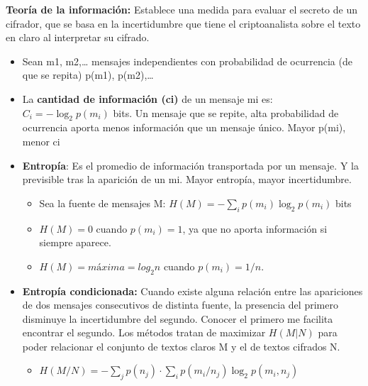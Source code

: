 \documentclass[12pt, twoside, openright]{report} %
\begin{document}
\textbf{Teoría de la información:} Establece una medida para evaluar el secreto de un cifrador, que se basa en la incertidumbre que tiene el criptoanalista sobre el texto en claro al interpretar su cifrado.

\begin{itemize}
	\item Sean m1, m2,\ldots{} mensajes independientes con probabilidad de ocurrencia (de que se repita) p(m1), p(m2),\ldots{}
	\item La \textbf{cantidad de información (ci)} de un mensaje mi es: $C_i=-\log_2 p(m_i)$ bits. Un mensaje que se repite, alta probabilidad de ocurrencia aporta menos información que un mensaje único. Mayor p(mi), menor ci
	\item \textbf{Entropía}: Es el promedio de información transportada por un mensaje. Y la previsible tras la aparición de un mi. Mayor entropía, mayor incertidumbre.
	      \begin{itemize}
		      \item Sea la fuente de mensajes M: $H(M)=-\sum\limits_i p(m_i) \log_2 p(m_i)$ bits
		      \item $H(M)=0$ cuando $p(m_i)=1$, ya que no aporta información si siempre aparece.
		      \item $H(M)=máxima=log_2 n$ cuando $p(m_i)=1/n$.
	      \end{itemize}
	\item \textbf{Entropía condicionada:} Cuando existe alguna relación entre las apariciones de dos mensajes consecutivos de distinta fuente, la presencia del primero disminuye la incertidumbre del segundo. Conocer el primero me facilita encontrar el segundo. Los métodos tratan de maximizar $H(M| N)$ para poder relacionar el conjunto de textos claros M y el de textos cifrados N.
	      \begin{itemize}
		      \item $H(M/N) =-\sum\limits_j p(n_j)\cdot \sum\limits_i p(m_i/n_j) \log_2 p(m_i, n_j)$
	      \end{itemize}
\end{itemize}
\end{document}
